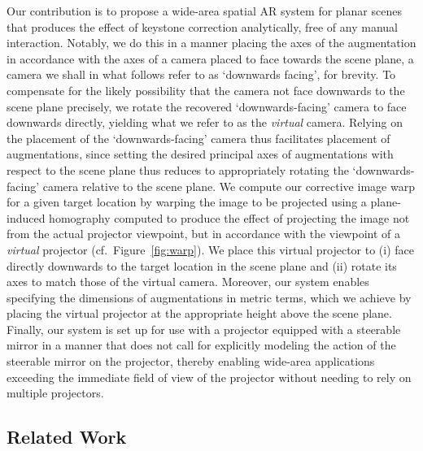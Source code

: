 \documentclass[review]{elsarticle}
\begin{document}
Our contribution is to propose a wide-area spatial AR system for planar scenes that produces the effect of keystone correction analytically, free of any manual interaction. Notably, we do this in a manner placing the axes of the augmentation in accordance with the axes of a camera placed to face towards the scene plane, a camera we shall in what follows refer to as `downwards facing', for brevity. To compensate for the likely possibility that the camera not face downwards to the scene plane precisely, we rotate the recovered `downwards-facing' camera to face downwards directly, yielding what we refer to as the \textit{virtual} camera. Relying on the placement of the `downwards-facing' camera thus facilitates placement of augmentations, since setting the desired principal axes of augmentations with respect to the scene plane thus reduces to appropriately rotating the `downwards-facing' camera relative to the scene plane. We compute our corrective image warp for a given target location by warping the image to be projected using a plane-induced homography computed to produce the effect of projecting the image not from the actual projector viewpoint, but in accordance with the viewpoint of a \textit{virtual} projector (cf.\ Figure~\ref{fig:warp}). We place this virtual projector to (i) face directly downwards to the target location in the scene plane and (ii) rotate its axes to match those of the virtual camera. Moreover, our system enables specifying the dimensions of augmentations in metric terms, which we achieve by placing the virtual projector at the appropriate height above the scene plane. Finally, our system is set up for use with a projector equipped with a steerable mirror in a manner that does not call for explicitly modeling the action of the steerable mirror on the projector, thereby enabling wide-area applications exceeding the immediate field of view of the projector without needing to rely on multiple projectors.

\subsection{Related Work}
\end{document}

